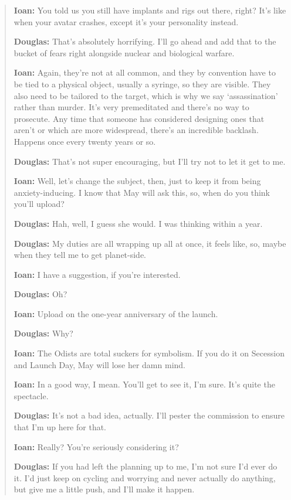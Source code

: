 \begin{quote}
\textbf{Ioan:} You told us you still have implants and rigs out there, right? It's like when your avatar crashes, except it's your personality instead.

\textbf{Douglas:} That's absolutely horrifying. I'll go ahead and add that to the bucket of fears right alongside nuclear and biological warfare.

\textbf{Ioan:} Again, they're not at all common, and they by convention have to be tied to a physical object, usually a syringe, so they are visible. They also need to be tailored to the target, which is why we say `assassination' rather than murder. It's very premeditated and there's no way to prosecute. Any time that someone has considered designing ones that aren't or which are more widespread, there's an incredible backlash. Happens once every twenty years or so.

\textbf{Douglas:} That's not super encouraging, but I'll try not to let it get to me.

\textbf{Ioan:} Well, let's change the subject, then, just to keep it from being anxiety-inducing. I know that May will ask this, so, when do you think you'll upload?

\textbf{Douglas:} Hah, well, I guess she would. I was thinking within a year.

\textbf{Douglas:} My duties are all wrapping up all at once, it feels like, so, maybe when they tell me to get planet-side.

\textbf{Ioan:} I have a suggestion, if you're interested.

\textbf{Douglas:} Oh?

\textbf{Ioan:} Upload on the one-year anniversary of the launch.

\textbf{Douglas:} Why?

\textbf{Ioan:} The Odists are total suckers for symbolism. If you do it on Secession and Launch Day, May will lose her damn mind.

\textbf{Ioan:} In a good way, I mean. You'll get to see it, I'm sure. It's quite the spectacle.

\textbf{Douglas:} It's not a bad idea, actually. I'll pester the commission to ensure that I'm up here for that.

\textbf{Ioan:} Really? You're seriously considering it?

\textbf{Douglas:} If you had left the planning up to me, I'm not sure I'd ever do it. I'd just keep on cycling and worrying and never actually do anything, but give me a little push, and I'll make it happen.


\end{quote}
